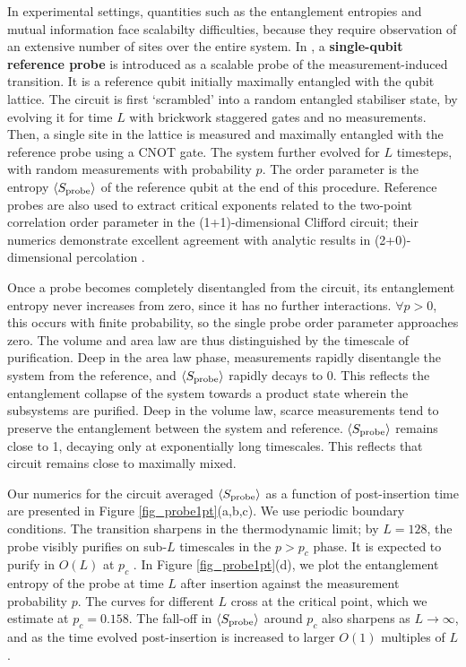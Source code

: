 \documentclass[10pt]{article}
\begin{document}

In experimental settings, quantities such as the entanglement entropies and mutual information face scalabilty difficulties, because they require observation of an extensive number of sites over the entire system. In \cite{gullans2019scalable}, a \textbf{single-qubit reference probe} is introduced as a scalable probe of the measurement-induced transition. It is a reference qubit initially maximally entangled with the qubit lattice. The circuit is first `scrambled' into a random entangled stabiliser state, by evolving it for time $L$ with brickwork staggered gates and no measurements. Then, a single site in the lattice is measured and maximally entangled with the reference probe using a CNOT gate. The system further evolved for $L$ timesteps, with random measurements with probability $p$. The order parameter is the entropy $\ev{S_\text{probe}}$ of the reference qubit at the end of this procedure. Reference probes are also used to extract critical exponents related to the two-point correlation order parameter in the (1+1)-dimensional Clifford circuit; their numerics demonstrate excellent agreement with analytic results in (2+0)-dimensional percolation \cite{gullans2019scalable, zabalo2020critical}. 

Once a probe becomes completely disentangled from the circuit, its entanglement entropy never increases from zero, since it has no further interactions. $\forall p>0$, this occurs with finite probability, so the single probe order parameter approaches zero. The volume and area law are thus distinguished by the timescale of purification. Deep in the area law phase, measurements rapidly disentangle the system from the reference, and $\ev{S_\text{probe}}$ rapidly decays to 0. This reflects the entanglement collapse of the system towards a product state wherein the subsystems are purified. Deep in the volume law, scarce measurements tend to preserve the entanglement between the system and reference. $\ev{S_\text{probe}}$ remains close to 1, decaying only at exponentially long timescales. This reflects that circuit remains close to maximally mixed. 

Our numerics for the circuit averaged $\ev{S_\text{probe}}$ as a function of post-insertion time are presented in Figure \ref{fig_probe1pt}(a,b,c). We use periodic boundary conditions. The transition sharpens in the thermodynamic limit; by $L=128$, the probe visibly purifies on sub-$L$ timescales in the $p > p_c$ phase. It is expected to purify in $O(L)$ at $p_c$ \cite{gullans2019scalable}. In Figure \ref{fig_probe1pt}(d), we plot the entanglement entropy of the probe at time $L$ after insertion against the measurement probability $p$. The curves for different $L$ cross at the critical point, which we estimate at $p_c=0.158$. The fall-off in $\ev{S_\text{probe}}$ around $p_c$ also sharpens as $L\rightarrow\infty$, and as the time evolved post-insertion is increased to larger $O(1)$ multiples of $L$.
\end{document}
